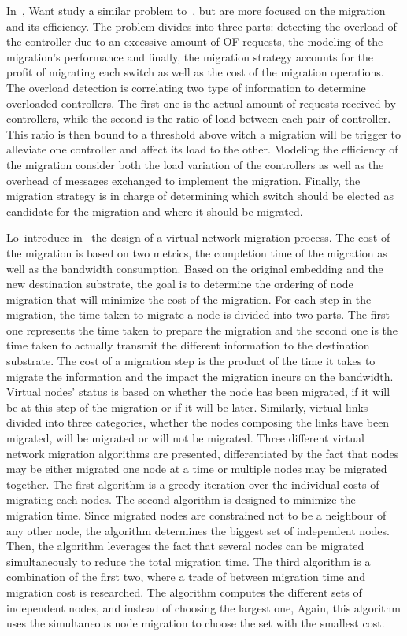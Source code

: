 In~\cite{Wang2017d}, Want \etal study a similar problem to~\cite{Ye2017a}, but are more focused on the migration and its efficiency. 
The problem divides into three parts: detecting the overload of the controller due to an excessive amount of OF requests, the modeling of the migration's performance and finally, the migration strategy accounts for the profit of migrating each switch as well as the cost of the migration operations.
The overload detection is correlating two type of information to determine overloaded controllers.
The first one is the actual amount of requests received by controllers, while the second is the ratio of load between each pair of controller.
This ratio is then bound to a threshold above witch a migration will be trigger to alleviate one controller and affect its load to the other.
Modeling the efficiency of the migration consider both the load variation of the controllers as well as the overhead of messages exchanged to implement the migration.  
Finally, the migration strategy is in charge of determining which switch should be elected as candidate for the migration and where it should be migrated.

Lo~\etal introduce in~\cite{vnm-lo2013} the design of a virtual network migration process.
The cost of the migration is based on two metrics, the completion time of the migration as well as the bandwidth consumption.
Based on the original embedding and the new destination substrate, the goal is to determine the ordering of node migration that will minimize the cost of the migration.
For each step in the migration, the time taken to migrate a node is divided into two parts. The first one represents the time taken to prepare the migration and the second one is the time taken to actually transmit the different information to the destination substrate.
The cost of a migration step is the product of the time it takes to migrate the information and the impact the migration incurs on the bandwidth.
Virtual nodes' status is based on whether the node has been migrated, if it will be at this step of the migration or if it will be later.
Similarly, virtual links divided into three categories, whether the nodes composing the links have been migrated, will be migrated or will not be migrated.
Three different virtual network migration algorithms are presented, differentiated by the fact that nodes may be either migrated one node at a time or multiple nodes may be migrated together.
The first algorithm is a greedy iteration over the individual costs of migrating each nodes.
The second algorithm is designed to minimize the migration time. Since migrated nodes are constrained not to be a neighbour of any other node, the algorithm determines the biggest set of independent nodes.
Then, the algorithm leverages the fact that several nodes can be migrated simultaneously to reduce the total migration time.
The third algorithm is a combination of the first two, where a trade of between migration time and migration cost is researched. The algorithm computes the different sets of independent nodes, and instead of choosing the largest one, Again, this algorithm uses the simultaneous node migration to choose the set with the smallest cost.

